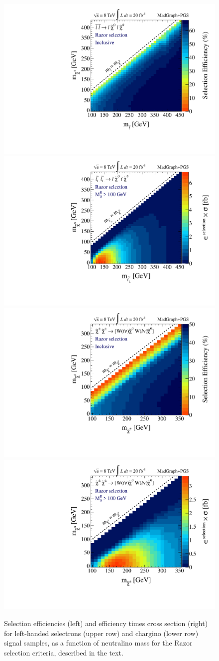 \begin{figure}[ht]
\includegraphics[width=0.3\columnwidth]{fig/sectionIII/EFF_slepton_Razor_incl.pdf}
\includegraphics[width=0.3\columnwidth]{fig/sectionIII/XSEC_sleptonL_Razor_Mdelta100.pdf}\\
\includegraphics[width=0.3\columnwidth]{fig/sectionIII/EFF_chargino_Razor_incl.pdf}
\includegraphics[width=0.3\columnwidth]{fig/sectionIII/XSEC_chargino_Razor_Mdelta100.pdf}
\caption{Selection efficiencies (left) and efficiency times cross section (right) for left-handed selectrons (upper row) and chargino (lower row) signal samples, as a function of neutralino mass for the Razor selection criteria, described in the text.  \label{fig:EFF_Razor}}
\end{figure}


